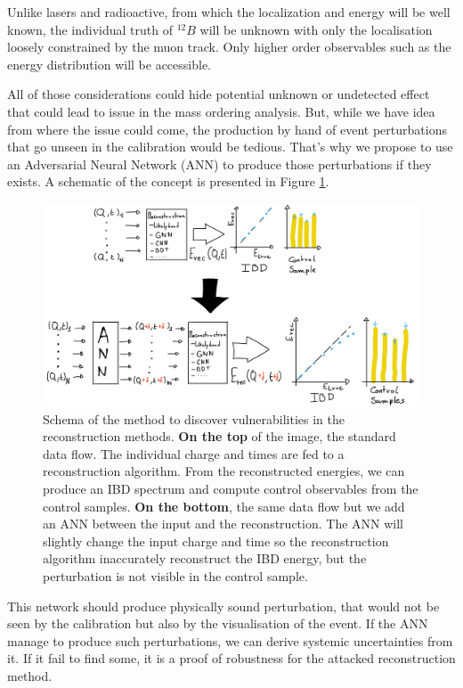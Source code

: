 \documentclass[../main.tex]{subfiles}
\begin{document}
Unlike lasers and radioactive, from which the localization and energy will be well known, the individual truth of $^{12}B$ will be unknown with only the localisation loosely constrained by the muon track. Only higher order observables such as the energy distribution will be accessible.

All of those considerations could hide potential unknown or undetected effect that could lead to issue in the mass ordering analysis. But, while we have idea from where the issue could come, the production by hand of event perturbations that go unseen in the calibration would be tedious. That's why we propose to use an Adversarial Neural Network (ANN) to produce those perturbations if they exists. A schematic of the concept is presented in Figure \ref{fig:janne:method:schema}.

\begin{figure}[ht]
  \centering
  \includegraphics[width=\linewidth]{images/janne/ann_method.jpg}
  \caption{Schema of the method to discover vulnerabilities in the reconstruction methods. \textbf{On the top} of the image, the standard data flow. The individual charge and times are fed to a reconstruction algorithm. From the reconstructed energies, we can produce an IBD spectrum and compute control observables from the control samples. \textbf{On the bottom}, the same data flow but we add an ANN between the input and the reconstruction. The ANN will slightly change the input charge and time so the reconstruction algorithm inaccurately reconstruct the IBD energy, but the perturbation is not visible in the control sample.}
  \label{fig:janne:method:schema}
\end{figure}

This network should produce physically sound perturbation, that would not be seen by the calibration but also by the visualisation of the event. If the ANN manage to produce such perturbations, we can derive systemic uncertainties from it. If it fail to find some, it is a proof of robustness for the attacked reconstruction method.
\end{document}
